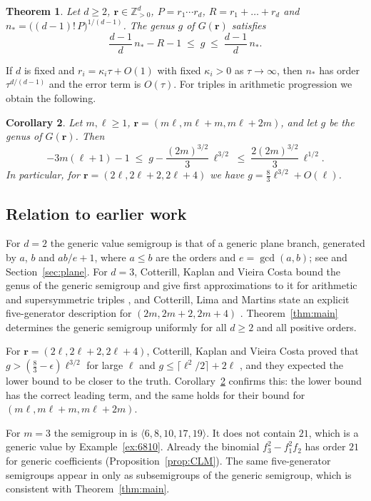 \documentclass{amsart}
\newtheorem{theorem}{Theorem}[section]
\newtheorem{corollary}[theorem]{Corollary}
\theoremstyle{definition}
\numberwithin{equation}{section}
\newcommand{\Z}{\mathbb{Z}}
\newcommand{\bfr}{\mathbf{r}}
\newcommand{\gen}[1]{\langle #1\rangle}
\begin{document}
\begin{theorem}\label{thm:asymp}
Let $d\ge2$, $\bfr\in\Z_{>0}^d$, $P=r_1\cdots r_d$, $R=r_1+\dots+r_d$ and
$n_*=\bigl((d-1)!\,P\bigr)^{1/(d-1)}$. The genus $g$ of $G(\bfr)$ satisfies
\[
  \frac{d-1}{d}\,n_*-R-1\;\le\;g\;\le\;\frac{d-1}{d}\,n_*.
\]
\end{theorem}

If $d$ is fixed and $r_i=\kappa_i\tau+O(1)$ with fixed $\kappa_i>0$ as
$\tau\to\infty$, then $n_*$ has order $\tau^{d/(d-1)}$ and the error term is
$O(\tau)$. For triples in arithmetic
progression we obtain the following.

\begin{corollary}\label{cor:arith}
Let $m,\ell\ge1$, $\bfr=(m\ell,m\ell+m,m\ell+2m)$, and let $g$ be the genus of
$G(\bfr)$. Then
\[
  -3m(\ell+1)-1\;\le\;g-\frac{(2m)^{3/2}}{3}\,\ell^{3/2}\;\le\;
  \frac{2(2m)^{3/2}}{3}\,\ell^{1/2}.
\]
In particular, for $\bfr=(2\ell,2\ell+2,2\ell+4)$ we have
$g=\frac83\ell^{3/2}+O(\ell)$.
\end{corollary}

\subsection*{Relation to earlier work}
For $d=2$ the generic value semigroup is that of a generic plane branch,
generated by $a$, $b$ and $ab/e+1$, where $a\le b$ are the orders and
$e=\gcd(a,b)$; see \cite[Section~1 and Section~1.1]{GMO} and
Section~\ref{sec:plane}. For $d=3$, Cotterill, Kaplan and Vieira Costa bound the
genus of the generic semigroup and give first approximations to it for
arithmetic and supersymmetric triples \cite[Sections~2 and~3]{CKV}, and
Cotterill, Lima and Martins state an explicit five-generator description for
$(2m,2m+2,2m+4)$ \cite[Theorem~3.16]{CLM}. Theorem~\ref{thm:main} determines the
generic semigroup uniformly for all $d\ge2$ and all positive orders.

For $\bfr=(2\ell,2\ell+2,2\ell+4)$, Cotterill, Kaplan and Vieira Costa proved
that $g>(\frac83-\epsilon)\ell^{3/2}$ for large $\ell$ \cite[Corollary~2.5]{CKV}
and $g\le\lceil\ell^2/2\rceil+2\ell$ \cite[Theorem~2.9]{CKV}, and they expected
the lower bound to be closer to the truth. Corollary~\ref{cor:arith} confirms
this: the lower bound has the correct leading term, and the same holds for
their bound \cite[Corollary~2.7]{CKV} for $(m\ell,m\ell+m,m\ell+2m)$.

For $m=3$ the semigroup in \cite[Theorem~3.16]{CLM} is $\gen{6,8,10,17,19}$.
It does not contain $21$, which is a generic value by
Example~\ref{ex:6810}. Already the binomial $f_3^2-f_1^2f_2$ has order $21$
for generic coefficients (Proposition~\ref{prop:CLM}). The same five-generator
semigroups appear in \cite[Theorem~2.9]{CKV} only as subsemigroups of the
generic semigroup, which is consistent with Theorem~\ref{thm:main}.
\end{document}

